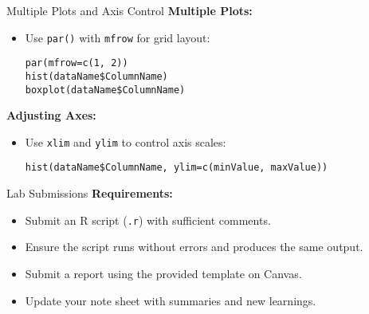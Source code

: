 \documentclass{beamer}
\begin{document}
\begin{frame}[fragile]{Multiple Plots and Axis Control}
\textbf{Multiple Plots:}
\begin{itemize}
    \item Use \texttt{par()} with \texttt{mfrow} for grid layout:
    \begin{verbatim}
par(mfrow=c(1, 2))
hist(dataName$ColumnName)
boxplot(dataName$ColumnName)
    \end{verbatim}
\end{itemize}

\textbf{Adjusting Axes:}
\begin{itemize}
    \item Use \texttt{xlim} and \texttt{ylim} to control axis scales:
    \begin{verbatim}
hist(dataName$ColumnName, ylim=c(minValue, maxValue))
    \end{verbatim}
\end{itemize}
\end{frame}

\begin{frame}{Lab Submissions}
\textbf{Requirements:}
\begin{itemize}
    \item Submit an R script (\texttt{.r}) with sufficient comments.
    \item Ensure the script runs without errors and produces the same output.
    \item Submit a report using the provided template on Canvas.
    \item Update your note sheet with summaries and new learnings.
\end{itemize}
\end{frame}
\end{document}
